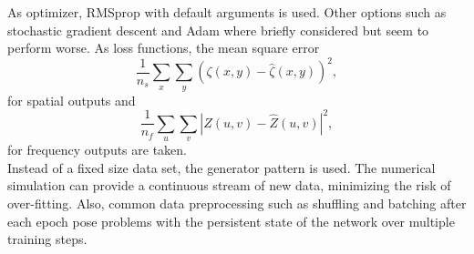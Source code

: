 \documentclass[sigconf]{acmart}
\begin{document}
As optimizer, RMSprop with default arguments \cite{RMSprop} is used. Other options such as stochastic gradient descent and Adam where briefly considered but seem to perform worse. As loss functions, the mean square error 
\begin{equation}\label{eq:mse}
	\frac{1}{n_s}\sum_{x}\sum_{y} (\zeta(x,y) - \hat{\zeta}(x,y))^2,
\end{equation}\label{eq:ferr}
for spatial outputs and
\begin{equation}
\frac{1}{n_f}\sum_{u}\sum_{v} |Z(u,v) - \hat{Z}(u,v)|^2,
\end{equation}
for frequency outputs are taken.\\
Instead of a fixed size data set, the generator pattern is used. The numerical simulation can provide a continuous stream of new data, minimizing the risk of over-fitting. Also, common data preprocessing such as shuffling and batching after each epoch pose problems with the persistent state of the network over multiple training steps.
\end{document}
